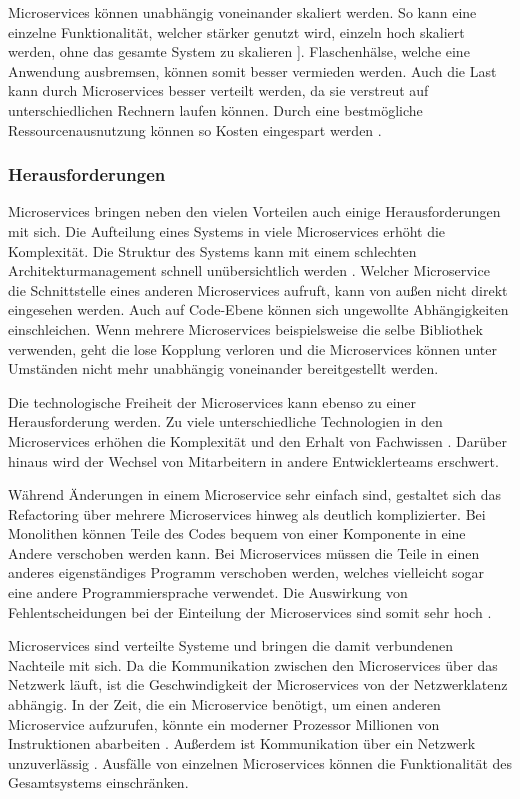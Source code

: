 Microservices können unabhängig voneinander skaliert werden. So kann eine einzelne Funktionalität, welcher stärker genutzt wird, einzeln hoch skaliert werden, ohne das gesamte System zu skalieren \parencite[vgl.][S. 5]{wolffMicroservices2018}]. Flaschenhälse, welche eine Anwendung ausbremsen, können somit besser vermieden werden. Auch die Last kann durch Microservices besser verteilt werden, da sie verstreut auf unterschiedlichen Rechnern laufen können. Durch eine bestmögliche Ressourcenausnutzung können so Kosten eingespart werden \parencite[vgl.][S. 27]{newmanMicroservices2015}.

\subsubsection{Herausforderungen}
Microservices bringen neben den vielen Vorteilen auch einige Herausforderungen mit sich. Die Aufteilung eines Systems in viele Microservices erhöht die Komplexität. Die Struktur des Systems kann mit einem schlechten Architekturmanagement schnell unübersichtlich werden \parencite[vgl.][S. 77]{wolffMicroservices2018}. Welcher Microservice die Schnittstelle eines anderen Microservices aufruft, kann von außen nicht direkt eingesehen werden. Auch auf Code-Ebene können sich ungewollte Abhängigkeiten einschleichen. Wenn mehrere Microservices beispielsweise die selbe Bibliothek verwenden, geht die lose Kopplung verloren und die Microservices können unter Umständen nicht mehr unabhängig voneinander bereitgestellt werden.

Die technologische Freiheit der Microservices kann ebenso zu einer Herausforderung werden. Zu viele unterschiedliche Technologien in den Microservices erhöhen die Komplexität und den Erhalt von Fachwissen \parencite[vgl.][S.65]{trempArchitekturen2021}. Darüber hinaus wird der Wechsel von Mitarbeitern in andere Entwicklerteams erschwert.

Während Änderungen in einem Microservice sehr einfach sind, gestaltet sich das Refactoring über mehrere Microservices hinweg als deutlich komplizierter. Bei Monolithen können Teile des Codes bequem von einer Komponente in eine Andere verschoben werden kann. Bei Microservices müssen die Teile in einen anderes eigenständiges Programm verschoben werden, welches vielleicht sogar eine andere Programmiersprache verwendet. Die Auswirkung von Fehlentscheidungen bei der Einteilung der Microservices sind somit sehr hoch \parencite[vgl.][S. 6]{wolffMicroservices2018}.

Microservices sind verteilte Systeme und bringen die damit verbundenen Nachteile mit sich. Da die Kommunikation zwischen den Microservices über das Netzwerk läuft, ist die Geschwindigkeit der Microservices von der Netzwerklatenz abhängig. In der Zeit, die ein Microservice benötigt, um einen anderen Microservice aufzurufen, könnte ein moderner Prozessor Millionen von Instruktionen abarbeiten \parencite[vgl.][S. 73]{wolffMicroservices2018}. Außerdem ist Kommunikation über ein Netzwerk unzuverlässig \parencite[vgl.][S. 76]{wolffMicroservices2018}. Ausfälle von einzelnen Microservices können die Funktionalität des Gesamtsystems einschränken.

